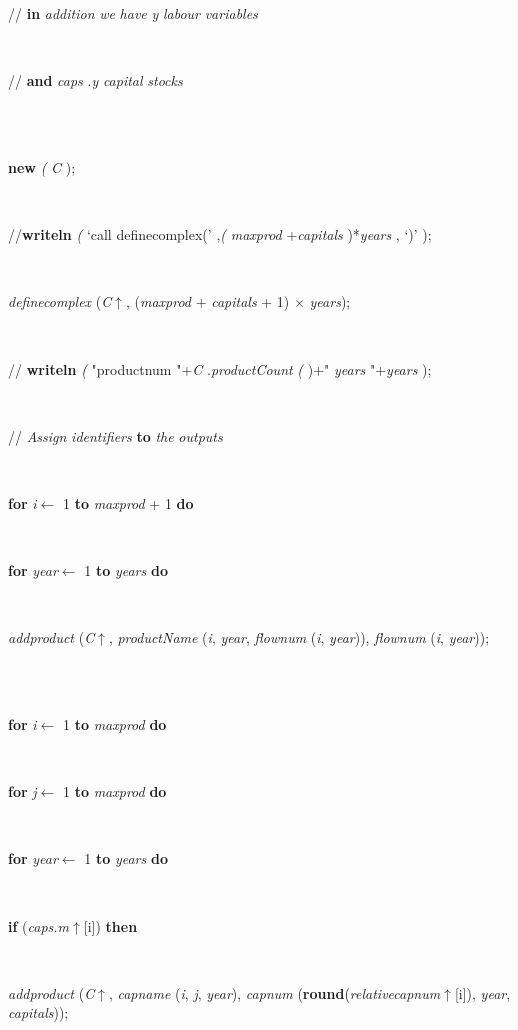 \documentclass[10pt, a4paper]{article}
\begin{document}
\begin{tabbing}
\parbox{14cm}{\textsf{// \textbf{in}  \textit{addition}  \textit{we}  \textit{have}  \textit{y}  \textit{labour}  \textit{variables} }}\\
\parbox{14cm}{\textsf{// \textbf{and}  \textit{caps} .\textit{y}  \textit{capital}  \textit{stocks} }}\\
\\
\-\parbox{14cm}{\textsf{\textbf{new} \textit{(} \textit{C} );}}\\
\parbox{14cm}{\textsf{//\textbf{writeln} \textit{(} \textrm{\textup { `call definecomplex(' } },\textit{(} \textit{maxprod} +\textit{capitals} )*\textit{years} ,\textrm{\textup { `)' } });}}\\
\parbox{14cm}{\textsf{\textit{definecomplex} (\textit{C}$\uparrow$\textit{}, (\textit{maxprod} + \textit{capitals} + 1) $\times$ \textit{years})}; }\\
\parbox{14cm}{\textsf{//    \textbf{writeln} \textit{(} "productnum "+\textit{C} .\textit{productCount} \textit{(} )+" \textit{years}  "+\textit{years} );}}\\
\parbox{14cm}{\textsf{// \textit{Assign}  \textit{identifiers}  \textbf{to}  \textit{the}  \textit{outputs} }}\\
\+\parbox{14cm}{\textsf {\textbf {for } \textsf{\textit{i}$\leftarrow$ 1} \textbf{ to } \textsf{\textit{maxprod} + 1} \textbf{ do } }}\\
\+\parbox{14cm}{\textsf {\textbf {for } \textsf{\textit{year}$\leftarrow$ 1} \textbf{ to } \textsf{\textit{years}} \textbf{ do } }}\\
\-\-\parbox{14cm}{\textsf{\textit{addproduct} (\textit{C}$\uparrow$\textit{}, \textit{productName} (\textit{i}, \textit{year}, \textit{flownum} (\textit{i}, \textit{year})), \textit{flownum} (\textit{i}, \textit{year}))}; }\\
\\
\+\parbox{14cm}{\textsf {\textbf {for } \textsf{\textit{i}$\leftarrow$ 1} \textbf{ to } \textsf{\textit{maxprod}} \textbf{ do } }}\\
\+\parbox{14cm}{\textsf {\textbf {for } \textsf{\textit{j}$\leftarrow$ 1} \textbf{ to } \textsf{\textit{maxprod}} \textbf{ do } }}\\
\+\parbox{14cm}{\textsf {\textbf {for } \textsf{\textit{year}$\leftarrow$ 1} \textbf{ to } \textsf{\textit{years}} \textbf{ do } }}\\
\+\parbox{14cm}{\textsf {\textbf {if } \textsf{(\textit{caps.m}$\uparrow$\textit{}[i])} \textbf{ then } }}\\
\-\-\-\-\parbox{14cm}{\textsf{\textit{addproduct} (\textit{C}$\uparrow$\textit{}, \textit{capname} (\textit{i}, \textit{j}, \textit{year}), \textit{capnum} (\textbf{round}(\textit{relativecapnum}$\uparrow$\textit{}[i]), \textit{year}, \textit{capitals}))}; }\\

\end{tabbing}
\end{document}
